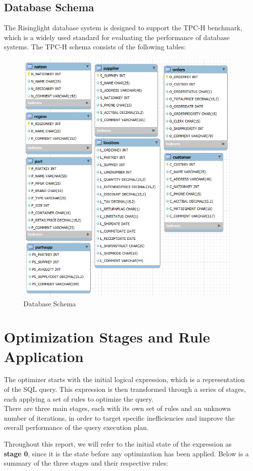 \documentclass[a4paper,12pt]{scrreprt}
\begin{document}
\section{Database Schema}

The Risinglight database system is designed to support the TPC-H benchmark, which is a widely used standard for evaluating the performance of database systems. The TPC-H schema consists of the following tables:
\begin{figure}[H]
    \centering
    \includegraphics[width=0.75\linewidth]{img/image.png}
    \caption{Database Schema}
    \label{fig:database_schema}
\end{figure}


\chapter{Optimization Stages and Rule Application}
\thispagestyle{fancy}
The optimizer starts with the initial logical expression, which is a representation of the SQL query. This expression is then transformed through a series of stages, each applying a set of rules to optimize the query. \\
There are three main stages, each with its own set of rules and an unknown number of iterations, in order to target specific inefficiencies and improve the overall performance of the query execution plan. 

Throughout this report, we will refer to the initial state of the expression as \textbf{stage 0}, since it is the state before any optimization has been applied.
Below is a summary of the three stages and their respective rules:
\end{document}
